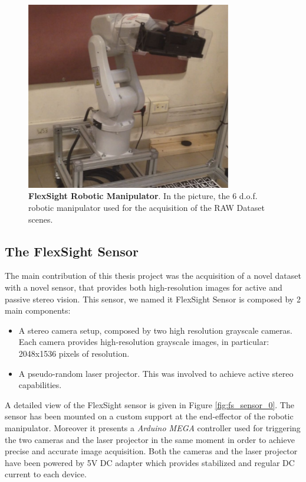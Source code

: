 \begin{figure}
    \centering
    \includegraphics[width=0.8\textwidth]{figures/3_raw_dataset/raw_robot_example}
    \caption{\textbf{FlexSight Robotic Manipulator}. In the picture, the 6 d.o.f. robotic manipulator used for the acquisition of the RAW Dataset scenes.}
    \label{fig:raw_robot_example}
\end{figure}

\subsection{The FlexSight Sensor}\label{subsec:raw_setup_fss}
The main contribution of this thesis project was the acquisition of a novel dataset with a novel sensor, that provides both high-resolution images for active and passive stereo vision. This sensor, we named it FlexSight Sensor is composed by 2 main components:

\begin{itemize}
	\item A stereo camera setup, composed by two high resolution grayscale cameras. Each camera provides high-resolution grayscale images, in particular: 2048x1536 pixels of resolution.
	\item A pseudo-random laser projector. This was involved to achieve active stereo capabilities.
\end{itemize}

A detailed view of the FlexSight sensor is given in Figure \ref{fig:fs_sensor_0}. The sensor has been mounted on a custom support at the end-effector of the robotic manipulator. Moreover it presents a \emph{Arduino MEGA} controller used for triggering the two cameras and the laser projector in the same moment in order to achieve precise and accurate image acquisition. Both the cameras and the laser projector have been powered by 5V DC adapter which provides stabilized and regular DC current to each device.

